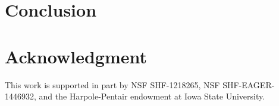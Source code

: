 \documentclass[conference]{IEEEtran}
\begin{document}


\section{Conclusion}
\label{sec:conclusion}

\section*{Acknowledgment}
This work is supported in part by NSF SHF-1218265, NSF SHF-EAGER-1446932, and the Harpole-Pentair endowment at Iowa State University.






\balance


\end{document}
